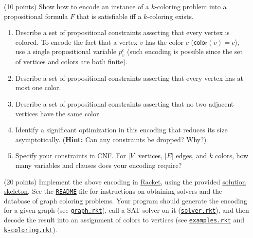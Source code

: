 \documentclass{handout}
\begin{document}
\begin{questions}
\item (10 points) Show how to encode an instance of a $k$-coloring problem into a propositional formula $F$ that is satisfiable iff a $k$-coloring exists.
\begin{enumerate}
\item Describe a set of propositional constraints asserting that every vertex is colored.  To encode the fact that a vertex $v$ has the color $c$ ($\mathsf{color}(v) = c$), use a single propositional variable $p^c_v$ (such encoding is possible since the set of vertices and colors are both finite).


\item Describe a set of propositional constraints asserting that every vertex has at most one color.



\item Describe a set of propositional constraints asserting that no two adjacent vertices have the same color.



\item Identify a significant optimization in this encoding that reduces its size asymptotically.  (\textbf{Hint:} Can any constraints be dropped?  Why?)



\item Specify your constraints in CNF.  For $|V|$ vertices, $|E|$ edges, and $k$ colors, how many variables and clauses does your encoding require?



\end{enumerate} \label{prob:encoding}

\item (20 points) \label{prob:kcol} Implement the above encoding in \href{http://racket-lang.org}{Racket}, using the provided \href{\gitlabpath/hw1/graph-coloring}{solution skeleton}.  See the  \href{\gitlabpath/hw1/README.md}{\texttt{README}} file for instructions on obtaining solvers and the database of graph coloring problems.  Your program should generate the encoding for a given graph (see \href{\gitlabpath/hw1/graph-coloring/graph.rkt}{\texttt{graph.rkt}}), call a SAT solver on it (\href{\gitlabpath/hw1/graph-coloring/solver.rkt}{\texttt{solver.rkt}}), and then decode the result into an assignment of colors to vertices  (see \href{\gitlabpath/hw1/graph-coloring/examples.rkt}{\texttt{examples.rkt}} and \href{\gitlabpath/hw1/graph-coloring/k-coloring.rkt}{\texttt{k-coloring.rkt}}).


\end{questions}
\end{document}
